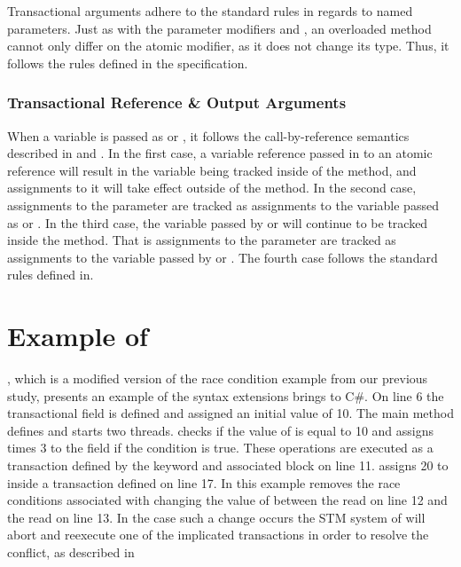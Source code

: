 Transactional arguments adhere to the standard rules in regards to named parameters\cite[p. 145]{csharp2013specificaiton}. Just as with the parameter modifiers  and , an overloaded method cannot only differ on the atomic modifier, as it does not change its type. Thus, it follows the rules defined in the specification\cite[p. 153-157]{csharp2013specificaiton}.

\subsubsection{Transactional Reference \& Output Arguments}\label{subsubsec:trans_ref_out_args}
When a variable is passed as  or , it follows the call-by-reference semantics described in  and . In the first case, a variable reference passed in to an atomic reference will result in the variable being tracked inside of the method, and assignments to it will take effect outside of the method. In the second case, assignments to the parameter are tracked as assignments to the variable passed as  or . In the third case, the variable passed by  or  will continue to be tracked inside the method. That is assignments to the parameter are tracked as assignments to the variable passed by  or . The fourth case follows the standard rules defined in\cite[p. 145]{csharp2013specificaiton}. 

\section{Example of \stmnamesp}\label{sec:example_design}
, which is a modified version of the race condition example from our previous study\cite[p. 23]{dpt907e14trending}, presents an example of the syntax extensions \stmnamesp brings to C\#. On line 6 the transactional field  is defined and assigned an initial value of 10. The main method defines and starts two threads.  checks if the value of  is equal to 10 and assigns  times 3 to the field if the condition is true. These operations are executed as a transaction defined by the  keyword and associated block on line 11.  assigns 20 to  inside a transaction defined on line 17. In this example \stmnamesp removes the race conditions associated with  changing the value of  between the read on line 12 and the read on line 13. In the case such a change occurs the \ac{STM} system of \stmnamesp will abort and reexecute one of the implicated transactions in order to resolve the conflict, as described in 
 
